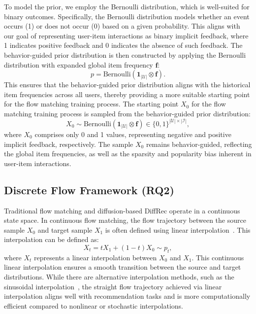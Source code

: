 \documentclass[sigconf]{acmart}
\begin{document}
To model the prior, we employ the Bernoulli distribution, which is well-suited for binary outcomes. Specifically, the Bernoulli distribution models whether an event occurs (1) or does not occur (0) based on a given probability. This aligns with our goal of representing user-item interactions as binary implicit feedback, where 1 indicates positive feedback and 0 indicates the absence of such feedback.
The behavior-guided prior distribution is then constructed by applying the Bernoulli distribution with expanded global item frequency $\mathbf f$:
\begin{equation}
    \label{behavior_guided_prior}
    p = \mathrm{Bernoulli}(\mathbf 1_{|\mathcal U|} \otimes \mathbf f) .
\end{equation}
This ensures that the behavior-guided prior distribution aligns with the historical item frequencies across all users, thereby providing a more suitable starting point for the flow matching training process.
The starting point $X_0$ for the flow matching training process is sampled from the behavior-guided prior distribution:
\begin{equation}
    \label{eq:sample_x0}
X_0 \sim  \mathrm{Bernoulli}(\mathbf 1_{|\mathcal U|} \otimes \mathbf f) \in \{0, 1\}^{|\mathcal U| \times |\mathcal I|},
\end{equation}
where $X_0$ comprises only 0 and 1 values, representing negative and positive implicit feedback, respectively. The sample $X_0$ remains behavior-guided, reflecting the global item frequencies, as well as the sparsity and popularity bias inherent in user-item interactions.

\subsection{Discrete Flow Framework (RQ2)}
Traditional flow matching and diffusion-based DiffRec operate in a continuous state space. In continuous flow matching, the flow trajectory between the source sample $X_0$ and target sample $X_1$ is often defined using linear interpolation~\cite{liu2022flow}. This interpolation can be defined as:
\begin{equation}
    \label{eq:interpolation_continuous}
    X_t = t X_1 + (1 - t) X_0 \sim p_t,
\end{equation}
where $X_t$ represents a linear interpolation between $X_0$ and $X_1$. This continuous linear interpolation ensures a smooth transition between the source and target distributions. While there are alternative interpolation methods, such as the sinusoidal interpolation~\cite{albergo2022building}, the straight flow trajectory achieved via linear interpolation aligns well with recommendation tasks and is more computationally efficient compared to nonlinear or stochastic interpolations.
\end{document}
